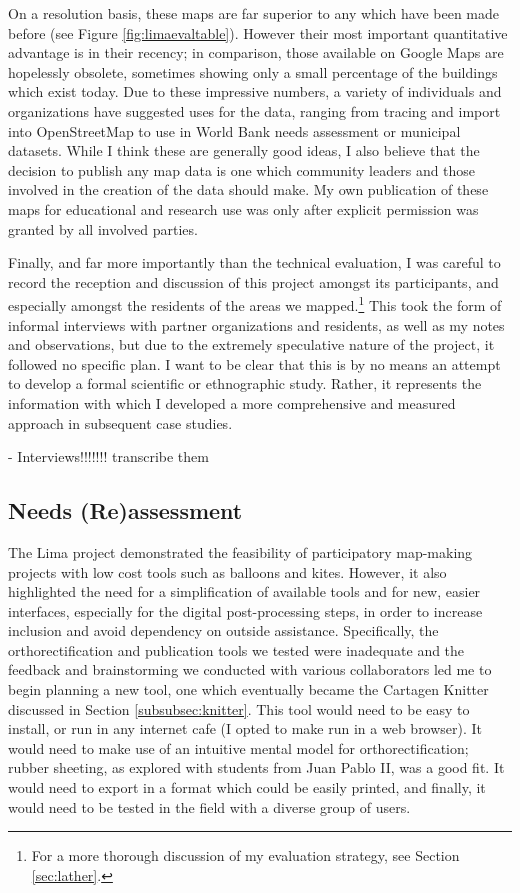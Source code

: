 \documentclass[11pt]{report}
\begin{document}
On a resolution basis, these maps are far superior to any which have been made before (see Figure \ref{fig:limaevaltable}). However their most important quantitative advantage is in their recency; in comparison, those available on Google Maps are hopelessly obsolete, sometimes showing only a small percentage of the buildings which exist today. Due to these impressive numbers, a variety of individuals and organizations have suggested uses for the data, ranging from tracing and import into OpenStreetMap to use in World Bank needs assessment or municipal datasets. While I think these are generally good ideas, I also believe that the decision to publish any map data is one which community leaders and those involved in the creation of the data should make. My own publication of these maps for educational and research use was only after explicit permission was granted by all involved parties. 

Finally, and far more importantly than the technical evaluation, I was careful to record the reception and discussion of this project amongst its participants, and especially amongst the residents of the areas we mapped.\footnote{For a more thorough discussion of my evaluation strategy, see Section \ref{sec:lather}.} This took the form of informal interviews with partner organizations and residents, as well as my notes and observations, but due to the extremely speculative nature of the project, it followed no specific plan. I want to be clear that this is by no means an attempt to develop a formal scientific or ethnographic study. Rather, it represents the information with which I developed a more comprehensive and measured approach in subsequent case studies.   

- Interviews!!!!!!! transcribe them



\subsection{Needs (Re)assessment}

The Lima project demonstrated the feasibility of participatory map-making projects with low cost tools such as balloons and kites. However, it also highlighted the need for a simplification of available tools and for new, easier interfaces, especially for the digital post-processing steps, in order to increase inclusion and avoid dependency on outside assistance. Specifically, the orthorectification and publication tools we tested were inadequate and the feedback and brainstorming we conducted with various collaborators led me to begin planning a new tool, one which eventually became the Cartagen Knitter discussed in Section \ref{subsubsec:knitter}. This tool would need to be easy to install, or run in any internet cafe (I opted to make run in a web browser). It would need to make use of an intuitive mental model for orthorectification; rubber sheeting, as explored with students from Juan Pablo II, was a good fit. It would need to export in a format which could be easily printed, and finally, it would need to be tested in the field with a diverse group of users. 
\end{document}
